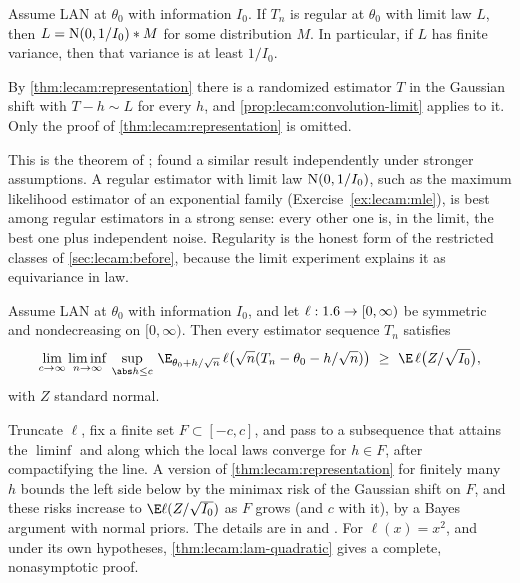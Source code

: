 \begin{refsection}
\begin{theorem}\label{thm:lecam:convolution}
Assume LAN at $\theta_0$ with information $I_0$. If $T_n$ is regular at $\theta_0$ with limit law $L$, then $L=\mathrm{N}(0,1/I_0)*M$ for some distribution $M$. In particular, if $L$ has finite variance, then that variance is at least $1/I_0$.
\end{theorem}

\begin{proofsketch}
By \cref{thm:lecam:representation} there is a randomized estimator $T$ in the Gaussian shift with $T-h\sim L$ for every $h$, and \cref{prop:lecam:convolution-limit} applies to it. Only the proof of \cref{thm:lecam:representation} is omitted.
\end{proofsketch}

This is the theorem of \textcite{Hajek1970}; \textcite{Inagaki1970} found a similar result independently under stronger assumptions. A regular estimator with limit law $\mathrm{N}(0,1/I_0)$, such as the maximum likelihood estimator of an exponential family (Exercise~\ref{ex:lecam:mle}), is best among regular estimators in a strong sense: every other one is, in the limit, the best one plus independent noise. Regularity is the honest form of the restricted classes of \cref{sec:lecam:before}, because the limit experiment explains it as equivariance in law.

\begin{theorem}\label{thm:lecam:lam}
Assume LAN at $\theta_0$ with information $I_0$, and let $\ell:1.6\to[0,\infty)$ be symmetric and nondecreasing on $[0,\infty)$. Then every estimator sequence $T_n$ satisfies
\[
  \lim_{c\to\infty}\liminf_{n\to\infty}\,\sup_{\abs h\le c}\,\E_{\theta_0+h/\sqrt n}\,\ell\big(\sqrt n(T_n-\theta_0-h/\sqrt n)\big)\ \ge\ \E\,\ell\big(Z/\sqrt{I_0}\big),
\]
with $Z$ standard normal.
\end{theorem}

\begin{proofsketch}
Truncate $\ell$, fix a finite set $F\subset[-c,c]$, and pass to a subsequence that attains the $\liminf$ and along which the local laws converge for $h\in F$, after compactifying the line. A version of \cref{thm:lecam:representation} for finitely many $h$ bounds the left side below by the minimax risk of the Gaussian shift on $F$, and these risks increase to $\E\ell(Z/\sqrt{I_0})$ as $F$ grows (and $c$ with it), by a Bayes argument with normal priors. The details are in \textcite{Hajek1972} and \textcite[Chapter~8]{vanderVaart1998}. For $\ell(x)=x^2$, and under its own hypotheses, \cref{thm:lecam:lam-quadratic} gives a complete, nonasymptotic proof.
\end{proofsketch}


\end{refsection}
